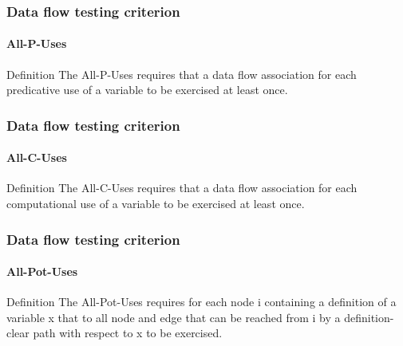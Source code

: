 \begin{frame}
\label{concept:all-p-uses}
\label{concept:all-p-uses-criterion}
\frametitle{Data flow testing criterion}
\framesubtitle{All-P-Uses}

\begin{block:concept}{Definition}
The All-P-Uses requires that a data flow association for each predicative
use of a variable to be exercised at least once.
\end{block:concept}
\end{frame}



\begin{frame}
\label{concept:all-c-uses}
\label{concept:all-c-uses-criterion}
\frametitle{Data flow testing criterion}
\framesubtitle{All-C-Uses}

\begin{block:concept}{Definition}
The All-C-Uses requires that a data flow association for each computational
use of a variable to be exercised at least once.
\end{block:concept}
\end{frame}



\begin{frame}[hasnext=false]
\label{concept:all-pot-uses}
\label{concept:all-pot-uses-criterion}
\frametitle{Data flow testing criterion}
\framesubtitle{All-Pot-Uses}

\begin{block:concept}{Definition}
The All-Pot-Uses requires for each node i containing a definition of
a variable x that to all node and edge that can be reached from i by a
definition-clear path with respect to x to be exercised.
\end{block:concept}

\hfill
{}
\end{frame}